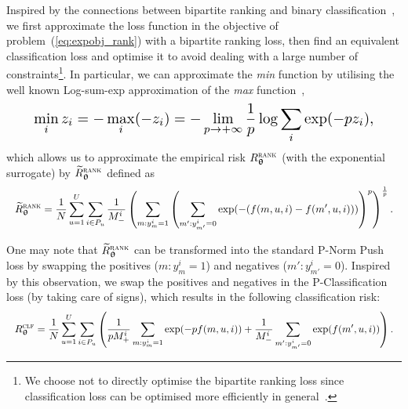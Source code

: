 Inspired by the connections between bipartite ranking and binary classification~\cite{ertekin2011equivalence,menon2016bipartite},
we first approximate the loss function in the objective of problem~(\ref{eq:expobj_rank}) with
a bipartite ranking loss, then find an equivalent classification loss and optimise it to 
avoid dealing with a large number of 
constraints\footnote{We choose not to directly optimise the bipartite ranking loss 
since classification loss can be optimised more efficiently in general~\cite{ertekin2011equivalence}.}.
%
In particular, 
we can approximate the \emph{min} function by utilising the well known Log-sum-exp approximation 
of the \emph{max} function~\cite[p. 72]{boyd2004convex},
\begin{equation*}
\resizebox{.9\columnwidth}{!}{$
  \displaystyle \min_i z_i 
= \displaystyle -\max_i (-z_i) 
= \displaystyle -\lim_{p \to +\infty} \frac{1}{p} \log \sum_i \exp(-p z_i),
$}
\end{equation*}
%
which allows us to approximate the empirical risk $R_{{\bm{\uptheta}}}^{\textsc{rank}}$ (with the exponential surrogate)
by $\widetilde R_{{\bm{\uptheta}}}^{\textsc{rank}}$ defined as
\begin{equation*}
\resizebox{\linewidth}{!}{$
\begin{aligned}
\widetilde R_{\upthetabm}^{\textsc{rank}}
= \frac{1}{N} \sum_{u=1}^U \sum_{i \in P_u} \frac{1}{M_-^i} \left( \sum_{m: y_m^i = 1} \left( \sum_{m': y_{m'}^i = 0} 
  \exp(-(f(m, u, i) - f(m', u, i))) \right)^p \right)^\frac{1}{p}.
\end{aligned}
$}
\end{equation*}


One may note that $\widetilde R_{{\bm{\uptheta}}}^{\textsc{rank}}$ can be transformed into the standard P-Norm Push loss by swapping the
positives ($m: y_m^i = 1$) and negatives ($m': y_{m'}^i = 0$). %
Inspired by this observation, we swap the positives and negatives in the P-Classification loss (by taking care of signs),
which results in the following classification risk:
\begin{equation*}
\resizebox{\linewidth}{!}{$\displaystyle
R_{\upthetabm}^{\textsc{clf}}
= \frac{1}{N} \sum_{u=1}^U \sum_{i \in P_u} \left(
  \frac{1}{p M_+^i} \sum_{m: y_m^i = 1} \exp(-p f(m, u, i))
  + \frac{1}{M_-^i} \sum_{m': y_{m'}^i = 0} \exp(f(m', u, i)) \right).
$}
\end{equation*}

